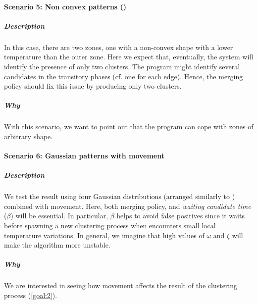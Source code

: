 \paragraph{Scenario 5: Non convex patterns ()}
\subparagraph{Description}
 In this case, there are two zones, one with a non-convex shape with a lower temperature than the outer zone.
 Here we expect that, eventually, the system will identify the presence of only two clusters.
 The program might identify several candidates in the transitory phases (cf. one for each edge).
 Hence, the merging policy should fix this issue by producing only two clusters.
 \subparagraph{Why} With this scenario, we want to point out that the program can cope with zones of arbitrary shape.
\paragraph{Scenario 6: Gaussian patterns with movement}
\subparagraph{Description}
We test the result using four Gaussian distributions (arranged similarly to ) combined with movement.
 Here, both merging policy, and \emph{waiting candidate time} ($\beta$) will be essential.
 In particular, $\beta$ helps to avoid false positives since it waits before spawning a new clustering process when encounters small local temperature variations.
 In general, we imagine that high values of $\omega$ and $\zeta$ will make the algorithm more unstable.
\subparagraph{Why} We are interested in seeing how movement affects the result of the clustering process (\ref{goal:2}).

